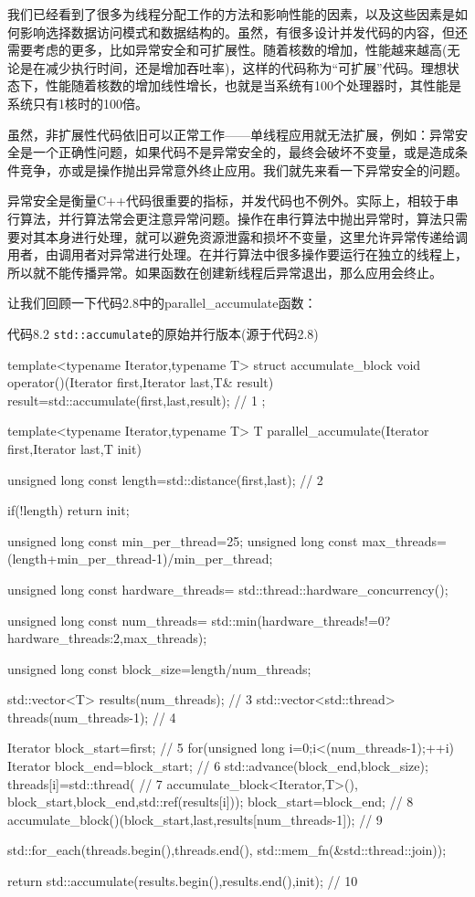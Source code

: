 
我们已经看到了很多为线程分配工作的方法和影响性能的因素，以及这些因素是如何影响选择数据访问模式和数据结构的。虽然，有很多设计并发代码的内容，但还需要考虑的更多，比如异常安全和可扩展性。随着核数的增加，性能越来越高(无论是在减少执行时间，还是增加吞吐率)，这样的代码称为“可扩展”代码。理想状态下，性能随着核数的增加线性增长，也就是当系统有100个处理器时，其性能是系统只有1核时的100倍。

虽然，非扩展性代码依旧可以正常工作——单线程应用就无法扩展，例如：异常安全是一个正确性问题，如果代码不是异常安全的，最终会破坏不变量，或是造成条件竞争，亦或是操作抛出异常意外终止应用。我们就先来看一下异常安全的问题。


异常安全是衡量C++代码很重要的指标，并发代码也不例外。实际上，相较于串行算法，并行算法常会更注意异常问题。操作在串行算法中抛出异常时，算法只需要对其本身进行处理，就可以避免资源泄露和损坏不变量，这里允许异常传递给调用者，由调用者对异常进行处理。在并行算法中很多操作要运行在独立的线程上，所以就不能传播异常。如果函数在创建新线程后异常退出，那么应用会终止。

让我们回顾一下代码2.8中的parallel\_accumulate函数：

代码8.2 \texttt{std::accumulate}的原始并行版本(源于代码2.8)

\begin{cpp}
template<typename Iterator,typename T>
struct accumulate_block
{
  void operator()(Iterator first,Iterator last,T& result)
  {
    result=std::accumulate(first,last,result);  // 1
  }
};

template<typename Iterator,typename T>
T parallel_accumulate(Iterator first,Iterator last,T init)
{
  unsigned long const length=std::distance(first,last);  // 2

  if(!length)
    return init;

  unsigned long const min_per_thread=25;
  unsigned long const max_threads=
    (length+min_per_thread-1)/min_per_thread;

  unsigned long const hardware_threads=
    std::thread::hardware_concurrency();

  unsigned long const num_threads=
    std::min(hardware_threads!=0?hardware_threads:2,max_threads);

  unsigned long const block_size=length/num_threads;

  std::vector<T> results(num_threads);  // 3
  std::vector<std::thread> threads(num_threads-1);  // 4

  Iterator block_start=first;  // 5
  for(unsigned long i=0;i<(num_threads-1);++i)
  {
    Iterator block_end=block_start;  // 6
    std::advance(block_end,block_size);
    threads[i]=std::thread(  // 7
      accumulate_block<Iterator,T>(),
      block_start,block_end,std::ref(results[i]));
    block_start=block_end;  // 8
  }
  accumulate_block()(block_start,last,results[num_threads-1]);  // 9

  std::for_each(threads.begin(),threads.end(),
    std::mem_fn(&std::thread::join));

  return std::accumulate(results.begin(),results.end(),init);  // 10
}
\end{cpp}

